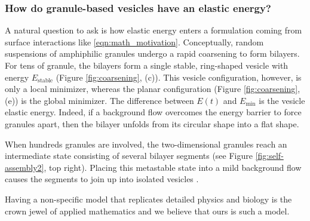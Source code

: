 \subsubsection{How do granule-based vesicles have an elastic energy?}
A natural question to ask is how 
elastic energy enters a formulation
coming from surface interactions like \eqref{eqn:math_motivation}.
Conceptually, random suspensions of amphiphilic
granules undergo a rapid coarsening to form bilayers.
For tens of granule, the bilayers form a single stable, ring-shaped vesicle
with energy $E_{\text{stable}}$ (Figure \ref{fig:coarsening}, (c)).
This vesicle configuration, however, is only a local minimizer,
whereas the planar configuration (Figure \ref{fig:coarsening}, (e))
is the global minimizer.  The difference between
$E(t)$ and $E_{\min}$ is the vesicle elastic energy.
Indeed, if a background flow overcomes the energy barrier to force granules apart,
then the bilayer unfolds from its circular shape into a flat shape.  

When hundreds granules are involved,
the two-dimensional granules reach an intermediate
state consisting of several bilayer segments (see Figure \ref{fig:self-assembly2}, top right).
Placing this metastable state into a mild background flow
causes the segments to join up into isolated vesicles \cite{fu-ryh-qua-you2022}.

Having a non-specific model that replicates detailed
physics and biology is the crown jewel of applied mathematics
and we believe that ours is such a model. 

